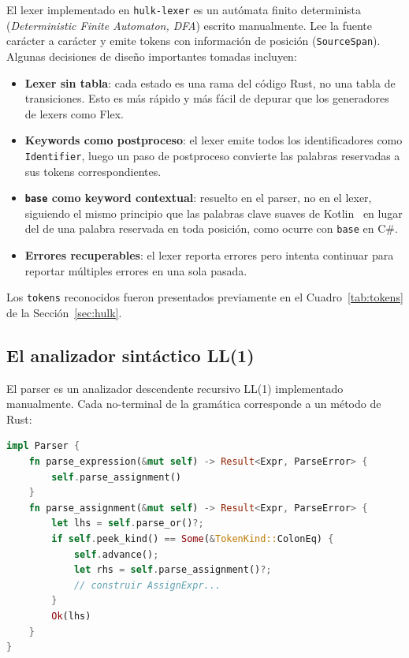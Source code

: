 \documentclass[12pt, a4paper]{article}
\begin{document}
El lexer implementado en \texttt{hulk-lexer} es un aut\'{o}mata finito determinista
(\textit{Deterministic Finite Automaton, DFA}) escrito manualmente. Lee la fuente car\'{a}cter a car\'{a}cter y emite tokens con
informaci\'{o}n de posici\'{o}n (\texttt{SourceSpan}). Algunas decisiones  de diseño importantes tomadas incluyen:
\begin{itemize}
    \item \textbf{Lexer sin tabla}: cada estado es una rama del c\'{o}digo Rust,
          no una tabla de transiciones. Esto es m\'{a}s r\'{a}pido y m\'{a}s f\'{a}cil de
          depurar que los generadores de lexers como Flex.
    \item \textbf{Keywords como postproceso}: el lexer emite todos los
          identificadores como \texttt{Identifier}, luego un paso de
          postproceso convierte las palabras reservadas a sus tokens
          correspondientes.
    \item \textbf{\texttt{base} como keyword contextual}: resuelto en el parser,
          no en el lexer, siguiendo el mismo principio que las palabras clave
          suaves de Kotlin~\cite{jemerov2017} en lugar del de una palabra reservada en toda
          posición, como ocurre con \texttt{base} en C\#.
    \item \textbf{Errores recuperables}: el lexer reporta errores pero intenta
          continuar para reportar m\'{u}ltiples errores en una sola pasada.
\end{itemize}
Los \texttt{tokens} reconocidos fueron presentados previamente en el Cuadro~\ref{tab:tokens} de la Sección~\ref{sec:hulk}.

\subsection{El analizador sint\'{a}ctico LL(1)}

El parser es un analizador descendente recursivo LL(1) implementado
manualmente. Cada no-terminal de la gram\'{a}tica corresponde a un m\'{e}todo de Rust:

\begin{lstlisting}[language=Rust, caption={Estructura del parser recursivo descendente},
                   label=lst:parser-struct]
impl Parser {
    fn parse_expression(&mut self) -> Result<Expr, ParseError> {
        self.parse_assignment()
    }
    fn parse_assignment(&mut self) -> Result<Expr, ParseError> {
        let lhs = self.parse_or()?;
        if self.peek_kind() == Some(&TokenKind::ColonEq) {
            self.advance();
            let rhs = self.parse_assignment()?;
            // construir AssignExpr...
        }
        Ok(lhs)
    }
}
\end{lstlisting}
\end{document}

